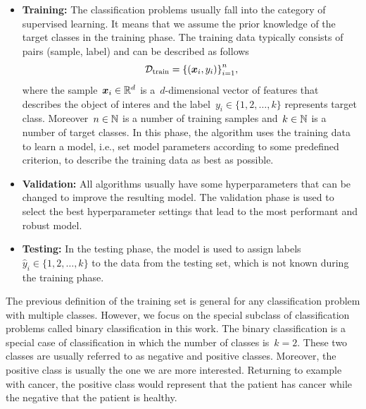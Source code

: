\begin{itemize}
  \item \textbf{Training:} The classification problems usually fall into the category of supervised learning. It means that we assume the prior knowledge of the target classes in the training phase. The training data typically consists of pairs (sample, label) and can be described as follows
  \begin{equation*}\label{eq: training set}
    \mathcal{D}_{\mathrm{train}} = \Brac[c]{(\bm{x}_i, y_i)}_{i=1}^{n},
  \end{equation*}
  where the sample~$\bm{x}_i \in \mathbb{R}^d$ is a~$d$-dimensional vector of features that describes the object of interes and the label~$y_i \in \{1, 2, \ldots, k\}$ represents target class. Moreover~$n \in \mathbb{N}$ is a number of training samples and~$k \in \mathbb{N}$ is a number of target classes. In this phase, the algorithm uses the training data to learn a model, i.e., set model parameters according to some predefined criterion, to describe the training data as best as possible.
  \item \textbf{Validation:} All algorithms usually have some hyperparameters that can be changed to improve the resulting model. The validation phase is used to select the best hyperparameter settings that lead to the most performant and robust model.
  \item \textbf{Testing:} In the testing phase, the model is used to assign labels~$\hat{y}_i \in \{1, 2, \ldots, k\}$ to the data from the testing set, which is not known during the training phase.
\end{itemize}
The previous definition of the training set is general for any classification problem with multiple classes. However, we focus on the special subclass of classification problems called binary classification in this work. The binary classification is a special case of classification in which the number of classes is~$k=2.$ These two classes are usually referred to as negative and positive classes. Moreover, the positive class is usually the one we are more interested. Returning to example with cancer, the positive class would represent that the patient has cancer while the negative that the patient is healthy.

